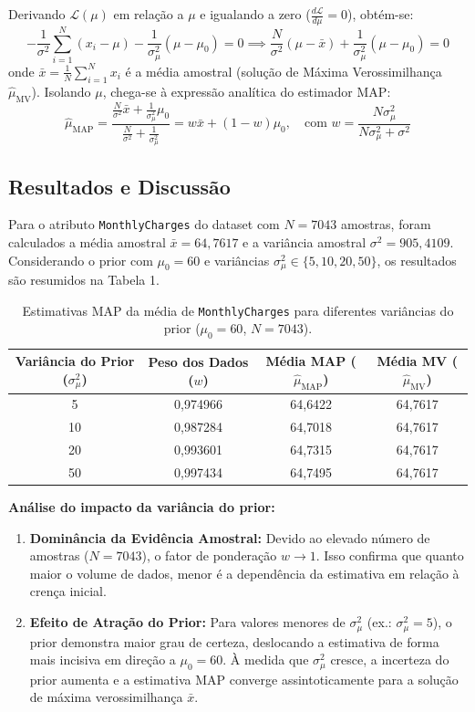 \documentclass[12pt,a4paper]{article}
\begin{document}
Derivando $\mathcal{L}(\mu)$ em relação a $\mu$ e igualando a zero ($\frac{d\mathcal{L}}{d\mu} = 0$), obtém-se:
\begin{equation}
-\frac{1}{\sigma^2} \sum_{i=1}^{N} (x_i - \mu) - \frac{1}{\sigma_\mu^2} (\mu - \mu_0) = 0 \implies \frac{N}{\sigma^2} (\mu - \bar{x}) + \frac{1}{\sigma_\mu^2} (\mu - \mu_0) = 0
\end{equation}
onde $\bar{x} = \frac{1}{N} \sum_{i=1}^{N} x_i$ é a média amostral (solução de Máxima Verossimilhança $\hat{\mu}_{\text{MV}}$). Isolando $\mu$, chega-se à expressão analítica do estimador MAP:
\begin{equation}
\hat{\mu}_{\text{MAP}} = \frac{\frac{N}{\sigma^2}\bar{x} + \frac{1}{\sigma_\mu^2}\mu_0}{\frac{N}{\sigma^2} + \frac{1}{\sigma_\mu^2}} = w \bar{x} + (1-w) \mu_0, \quad \text{com } w = \frac{N\sigma_\mu^2}{N\sigma_\mu^2 + \sigma^2}
\end{equation}

\subsection{Resultados e Discussão}
Para o atributo \texttt{MonthlyCharges} do dataset com $N = 7043$ amostras, foram calculados a média amostral $\bar{x} = 64{,}7617$ e a variância amostral $\sigma^2 = 905{,}4109$. Considerando o prior com $\mu_0 = 60$ e variâncias $\sigma_\mu^2 \in \{5, 10, 20, 50\}$, os resultados são resumidos na Tabela 1.

\begin{table}[H]
\centering
\caption{Estimativas MAP da média de \texttt{MonthlyCharges} para diferentes variâncias do prior ($\mu_0 = 60$, $N = 7043$).}
\begin{tabular}{cccc}
\toprule
Variância do Prior ($\sigma_\mu^2$) & Peso dos Dados ($w$) & Média MAP ($\hat{\mu}_{\text{MAP}}$) & Média MV ($\hat{\mu}_{\text{MV}}$) \\
\midrule
5  & 0{,}974966 & 64{,}6422 & 64{,}7617 \\
10 & 0{,}987284 & 64{,}7018 & 64{,}7617 \\
20 & 0{,}993601 & 64{,}7315 & 64{,}7617 \\
50 & 0{,}997434 & 64{,}7495 & 64{,}7617 \\
\bottomrule
\end{tabular}
\end{table}

\textbf{Análise do impacto da variância do prior:}
\begin{enumerate}
    \item \textbf{Dominância da Evidência Amostral:} Devido ao elevado número de amostras ($N = 7043$), o fator de ponderação $w \to 1$. Isso confirma que quanto maior o volume de dados, menor é a dependência da estimativa em relação à crença inicial.
    \item \textbf{Efeito de Atração do Prior:} Para valores menores de $\sigma_\mu^2$ (ex.: $\sigma_\mu^2 = 5$), o prior demonstra maior grau de certeza, deslocando a estimativa de forma mais incisiva em direção a $\mu_0 = 60$. À medida que $\sigma_\mu^2$ cresce, a incerteza do prior aumenta e a estimativa MAP converge assintoticamente para a solução de máxima verossimilhança $\bar{x}$.
\end{enumerate}
\end{document}
